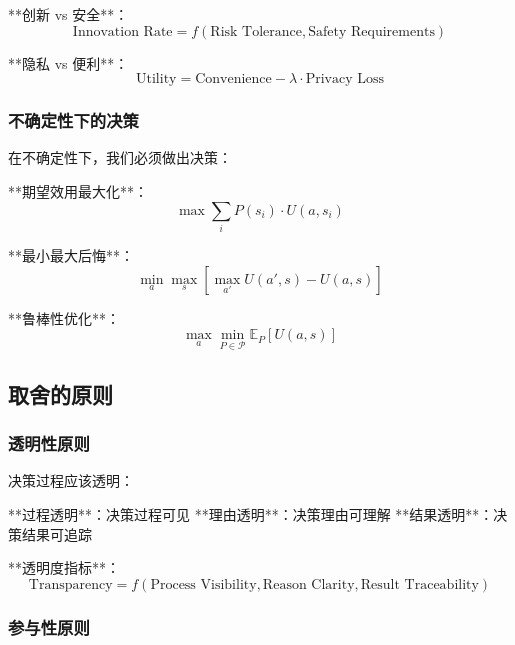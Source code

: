 **创新 vs 安全**：
\begin{equation}
\text{Innovation Rate} = f(\text{Risk Tolerance}, \text{Safety Requirements})
\end{equation}

**隐私 vs 便利**：
\begin{equation}
\text{Utility} = \text{Convenience} - \lambda \cdot \text{Privacy Loss}
\end{equation}

\subsubsection{不确定性下的决策}

在不确定性下，我们必须做出决策：

**期望效用最大化**：
\begin{equation}
\max \sum_i P(s_i) \cdot U(a, s_i)
\end{equation}

**最小最大后悔**：
\begin{equation}
\min_a \max_s \left[ \max_{a'} U(a', s) - U(a, s) \right]
\end{equation}

**鲁棒性优化**：
\begin{equation}
\max_a \min_{P \in \mathcal{P}} \mathbb{E}_P[U(a, s)]
\end{equation}

\subsection{取舍的原则}

\subsubsection{透明性原则}

决策过程应该透明：

**过程透明**：决策过程可见
**理由透明**：决策理由可理解
**结果透明**：决策结果可追踪

**透明度指标**：
\begin{equation}
\text{Transparency} = f(\text{Process Visibility}, \text{Reason Clarity}, \text{Result Traceability})
\end{equation}

\subsubsection{参与性原则}


